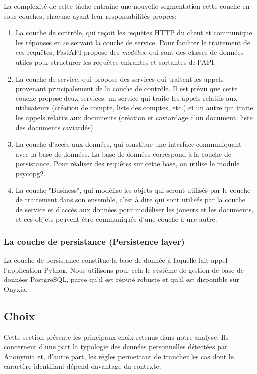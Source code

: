 \documentclass[12pt,a4paper]{article}
\begin{document}
La complexité de cette tâche entraîne une nouvelle segmentation cette couche en sous-couches, chacune ayant leur responsabilités propres:
\begin{enumerate}
\label{sec:controle}
\item La couche de contrôle, qui reçoit les requêtes HTTP du client et communique les réponses en se servant la couche de service. Pour faciliter le traitement de ces requêtes, FastAPI propose des \textit{modèles}, qui sont des classes de données utiles pour structurer les requêtes entrantes et sortantes de l'API.
\item La couche de service, qui propose des services qui traitent les appels provenant principalement de la couche de contrôle. Il est prévu que cette couche propose deux services: un service qui traite les appels relatifs aux utilisateurs (création de compte, liste des comptes, etc.) et un autre qui traite les appels relatifs aux documents (création et caviardage d'un document, liste des documents caviardés).
\item La couche d'accès aux données, qui constitue une interface communiquant avec la base de données. La base de données correspond à la couche de persistance. Pour réaliser des requêtes sur cette base, on utilise le module \href{https://www.psycopg.org/}{psycopg2}. 
\item La couche "Business", qui modélise les objets qui seront utilisés par le couche de traitement dans son ensemble, c'est à dire qui sont utilisés par la couche de service et d'accès aux données pour modéliser les joueurs et les documents, et ces objets peuvent être communiqués d'une couche à une autre.
\end{enumerate}

\subsubsection{La couche de persistance (Persistence layer)}
La couche de persistance constitue la base de donnée à laquelle fait appel l'application Python. Nous utilisons pour cela le système de gestion de base de données PostgreSQL, parce qu'il est réputé robuste et qu'il est disponible sur Onyxia. 

\subsection{Choix}

Cette section présente les principaux choix retenus dans notre analyse. 
Ils concernent d'une part la typologie des données personnelles détectées 
par Anonymia et, d'autre part, les règles permettant de trancher les cas 
dont le caractère identifiant dépend davantage du contexte.
\end{document}
